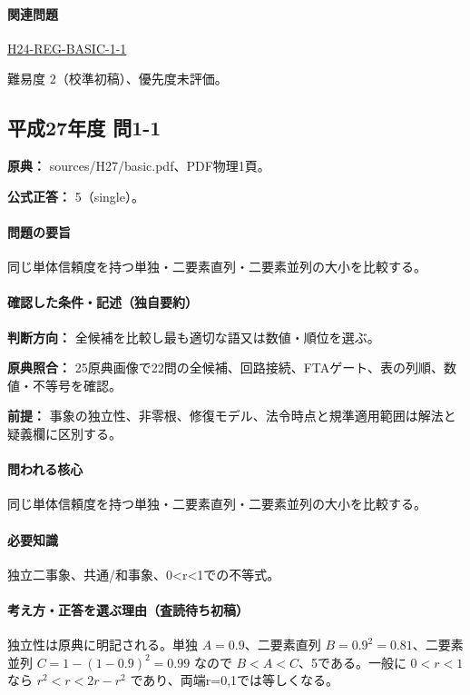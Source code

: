 \paragraph{関連問題} \hyperref[q:h24-reg-basic-1-1]{H24-REG-BASIC-1-1}

\par 難易度 2（校準初稿）、優先度未評価。

\subsection{平成27年度 問1-1}
\label{q:h27-reg-basic-1-1}

\noindent\textbf{原典：} sources/H27/basic.pdf、PDF物理1頁。

\textbf{公式正答：} 5（single）。

\paragraph{問題の要旨} 同じ単体信頼度を持つ単独・二要素直列・二要素並列の大小を比較する。

\paragraph{確認した条件・記述（独自要約）}\mbox{}\par

\noindent\textbf{判断方向：} 全候補を比較し最も適切な語又は数値・順位を選ぶ。\par

\noindent\textbf{原典照合：} 25原典画像で22問の全候補、回路接続、FTAゲート、表の列順、数値・不等号を確認。\par

\noindent\textbf{前提：} 事象の独立性、非零根、修復モデル、法令時点と規準適用範囲は解法と疑義欄に区別する。\par

\paragraph{問われる核心} 同じ単体信頼度を持つ単独・二要素直列・二要素並列の大小を比較する。

\paragraph{必要知識} 独立二事象、共通/和事象、0<r<1での不等式。

\paragraph{考え方・正答を選ぶ理由（査読待ち初稿）} 独立性は原典に明記される。単独 \(A=0.9\)、二要素直列 \(B=0.9^2=0.81\)、二要素並列 \(C=1-(1-0.9)^2=0.99\) なので \(B<A<C\)、5である。一般に \(0<r<1\) なら \(r^2<r<2r-r^2\) であり、両端r=\allowbreak{}0,1では等しくなる。

